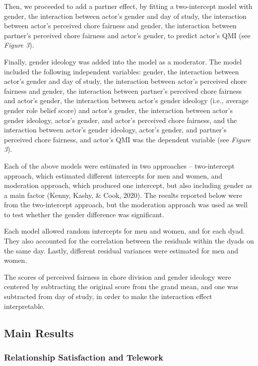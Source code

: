 \documentclass[
  english,
  man]{apa6}
\begin{document}
Then, we proceeded to add a partner effect, by fitting a two-intercept model with gender, the interaction between actor's gender and day of study, the interaction between actor's perceived chore fairness and gender, the interaction between partner's perceived chore fairness and actor's gender, to predict actor's QMI (see \emph{Figure 3}).

Finally, gender ideology was added into the model as a moderator. The model included the following independent variables: gender, the interaction between actor's gender and day of study, the interaction between actor's perceived chore fairness and gender, the interaction between partner's perceived chore fairness and actor's gender, the interaction between actor's gender ideology (i.e., average gender role belief score) and actor's gender, the interaction between actor's gender ideology, actor's gender, and actor's perceived chore fairness, and the interaction between actor's gender ideology, actor's gender, and partner's perceived chore fairness, and actor's QMI was the dependent variable (see \emph{Figure 3}).

Each of the above models were estimated in two approaches -- two-intercept approach, which estimated different intercepts for men and women, and moderation approach, which produced one intercept, but also including gender as a main factor (Kenny, Kashy, \& Cook, 2020). The results reported below were from the two-intercept approach, but the moderation approach was used as well to test whether the gender difference was significant.

Each model allowed random intercepts for men and women, and for each dyad. They also accounted for the correlation between the residuals within the dyads on the same day. Lastly, different residual variances were estimated for men and women.

The scores of perceived fairness in chore division and gender ideology were centered by subtracting the original score from the grand mean, and one was subtracted from day of study, in order to make the interaction effect interpretable.

\hypertarget{main-results}{%
\subsection{Main Results}\label{main-results}}

\hypertarget{relationship-satisfaction-and-telework}{%
\subsubsection{Relationship Satisfaction and Telework}\label{relationship-satisfaction-and-telework}}
\end{document}
